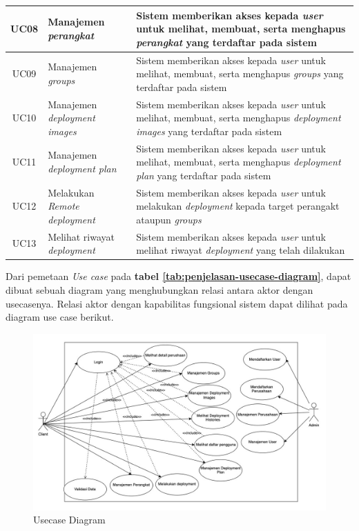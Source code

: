 \begin{table}[ht]
\begin{tabular}{|c|p{4cm}|p{8cm}|}
    \hline
    UC08 & Manajemen \textit{perangkat}               & Sistem memberikan akses kepada \textit{user} untuk melihat, membuat, serta menghapus \textit{perangkat} yang terdaftar pada sistem         \\
    \hline
    UC09 & Manajemen \textit{groups}                  & Sistem memberikan akses kepada \textit{user} untuk melihat, membuat, serta menghapus \textit{groups} yang terdaftar pada sistem            \\
    \hline
    UC10 & Manajemen \textit{deployment images}       & Sistem memberikan akses kepada \textit{user} untuk melihat, membuat, serta menghapus \textit{deployment images} yang terdaftar pada sistem \\
    \hline
    UC11 & Manajemen \textit{deployment plan}         & Sistem memberikan akses kepada \textit{user} untuk melihat, membuat, serta menghapus \textit{deployment plan} yang terdaftar pada sistem   \\
    \hline
    UC12 & Melakukan \textit{Remote deployment}       & Sistem memberikan akses kepada \textit{user} untuk melakukan \textit{deployment} kepada target perangakt ataupun \textit{groups}           \\
    \hline
    UC13 & Melihat riwayat \textit{deployment}        & Sistem memberikan akses kepada \textit{user} untuk melihat riwayat \textit{deployment} yang telah dilakukan                                \\
    \hline
  \end{tabular}
\end{table}

Dari pemetaan \textit{Use case} pada \textbf{tabel \ref{tab:penjelasan-usecase-diagram}}, dapat dibuat sebuah diagram yang menghubungkan relasi antara aktor dengan usecasenya. Relasi  aktor dengan kapabilitas fungsional sistem dapat dilihat pada diagram use case berikut.

\begin{figure}[ht]
  \centering
  \includegraphics[width=1\textwidth]{resources/chapter-3/usecase-diagram.jpg}
  \caption{Usecase Diagram}
  \label{fig:usecase-diagram}
\end{figure}